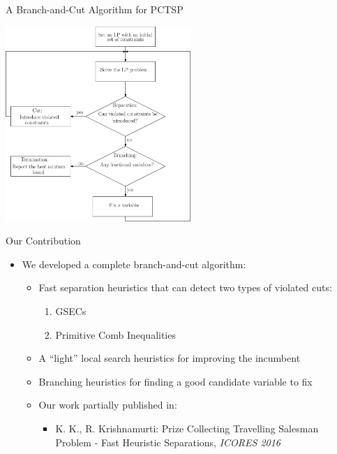 \documentclass[10pt]{beamer}
\begin{document}
\begin{frame}{A Branch-and-Cut Algorithm for PCTSP}
\begin{center}
        \includegraphics[width=7cm]{Branch_and_Cut.eps} 
\end{center}
\end{frame}

\begin{frame}{Our Contribution}
\begin{itemize}
    \item<1-> We developed a complete branch-and-cut algorithm:
    \begin{itemize}
        \item<2-> Fast separation heuristics that can detect two types of violated cuts:
        \begin{enumerate}
            \item<3-> GSECs
            \item<4-> Primitive Comb Inequalities
        \end{enumerate}
        \item<5-> A ``light'' local search heuristics for improving the incumbent
        \item<6-> Branching heuristics for finding a good candidate variable to fix
        \item<7-> Our work partially published in:
        \begin{itemize}
            \item<8-> K. K., R. Krishnamurti: \alert{Prize Collecting Travelling Salesman Problem - Fast Heuristic Separations}, \emph{ICORES 2016} \cite{KK16}
        \end{itemize}
    \end{itemize}
\end{itemize}
\end{frame}
\end{document}
